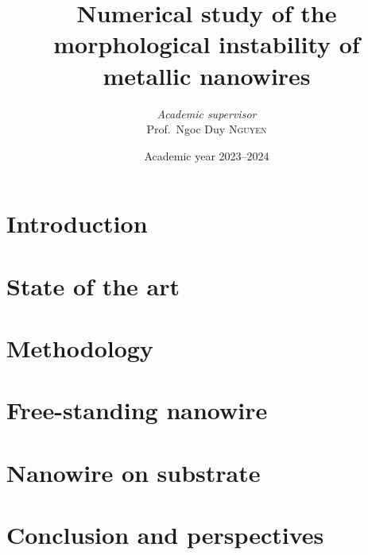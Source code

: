 \documentclass[twoside, 12pt]{report}
\institute{University of Liège}
\title{Numerical study of the morphological instability of metallic nanowires}
\author{\textit{Academic supervisor}\\Prof.\ Ngoc Duy \textsc{Nguyen}}
\date{Academic year 2023--2024}
\begin{document}
    \maketitle
    \chapter*{Introduction}\label{chap:intro}
    
    \chapter{State of the art}
    
    \chapter{Methodology}
    
    \chapter{Free-standing nanowire}
    
    \chapter{Nanowire on substrate}
    
    \chapter*{Conclusion and perspectives}\label{chap:concl}
    

    
    \newpage
    \appendix
    
    
    \newpage

    \nocite{*}
    \printbibliography%
\end{document}
